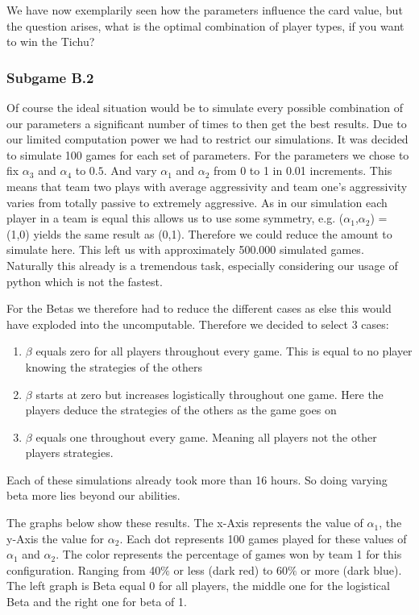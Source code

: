 We have now exemplarily seen how the parameters influence the card value, but the question arises, what is the optimal combination of player types, if you want to win the Tichu?

\subsubsection{Subgame B.2}
Of course the ideal situation would be to simulate every possible combination of our parameters a significant number of times to then get the best results. Due to our limited computation power we had to restrict our simulations. It was decided to simulate 100 games for each set of parameters. For the parameters we chose to fix $\alpha_3$ and $\alpha_4$ to $0.5$. And vary $\alpha_1$ and $\alpha_2$ from 0 to 1 in 0.01 increments. This means that team two plays with average aggressivity and team one’s aggressivity varies from totally passive to extremely aggressive. As in our simulation each player in a team is equal this allows us to use some symmetry, e.g. ($\alpha_1$,$\alpha_2$) = (1,0) yields the same result as (0,1). Therefore we could reduce the amount to simulate here. This left us with approximately 500.000 simulated games. Naturally this already is a tremendous task, especially considering our usage of python which is not the fastest.

For the Betas we therefore had to reduce the different cases as else this would have exploded into the uncomputable. Therefore we decided to select 3 cases:
\begin{enumerate}
\item $\beta$ equals zero for all players throughout every game. This is equal to no player knowing the strategies of the others
\item $\beta$ starts at zero but increases logistically throughout one game. Here the players deduce the strategies of the others as the game goes on
\item $\beta$ equals one throughout every game. Meaning all players not the other players strategies.
\end{enumerate}
Each of these simulations already took more than 16 hours. So doing varying beta more lies beyond our abilities. 

The graphs below show these results. The x-Axis represents the value of $\alpha_1$, the y-Axis the value for $\alpha_2$. Each dot represents 100 games played for these values of $\alpha_1$ and $\alpha_2$. The color represents the percentage of games won by team 1 for this configuration. Ranging from 40$\%$ or less (dark red) to 60$\%$ or more (dark blue). The left graph is Beta equal 0 for all players, the middle one for the logistical Beta and the right one for beta of 1.

